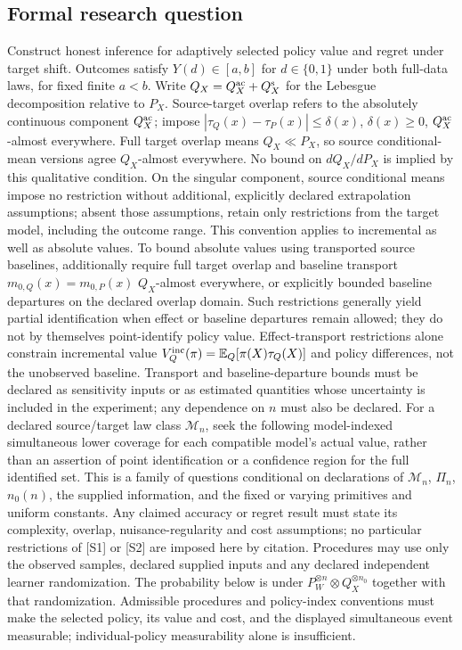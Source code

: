 \documentclass[11pt,a4paper]{article}
\begin{document}
\subsection*{Formal research question}

Construct honest inference for adaptively selected policy value and regret under target shift. Outcomes satisfy $Y(d)\in[a,b]$ for $d\in\{0,1\}$ under both full-data laws, for fixed finite $a<b$. Write $Q_X=Q_X^{\rm ac}+Q_X^{\rm s}$ for the Lebesgue decomposition relative to $P_X$. Source-target overlap refers to the absolutely continuous component $Q_X^{\rm ac}$; impose $|\tau_Q(x)-\tau_P(x)|\le\delta(x)$, $\delta(x)\ge0$, $Q_X^{\rm ac}$-almost everywhere. Full target overlap means $Q_X\ll P_X$, so source conditional-mean versions agree $Q_X$-almost everywhere. No bound on $dQ_X/dP_X$ is implied by this qualitative condition. On the singular component, source conditional means impose no restriction without additional, explicitly declared extrapolation assumptions; absent those assumptions, retain only restrictions from the target model, including the outcome range. This convention applies to incremental as well as absolute values. To bound absolute values using transported source baselines, additionally require full target overlap and baseline transport $m_{0,Q}(x)=m_{0,P}(x)$ $Q_X$-almost everywhere, or explicitly bounded baseline departures on the declared overlap domain. Such restrictions generally yield partial identification when effect or baseline departures remain allowed; they do not by themselves point-identify policy value. Effect-transport restrictions alone constrain incremental value $V_Q^{\rm inc}(\pi)=\mathbb E_Q[\pi(X)\tau_Q(X)]$ and policy differences, not the unobserved baseline. Transport and baseline-departure bounds must be declared as sensitivity inputs or as estimated quantities whose uncertainty is included in the experiment; any dependence on $n$ must also be declared. For a declared source/target law class $\mathcal M_n$, seek the following model-indexed simultaneous lower coverage for each compatible model's actual value, rather than an assertion of point identification or a confidence region for the full identified set. This is a family of questions conditional on declarations of $\mathcal M_n$, $\Pi_n$, $n_0(n)$, the supplied information, and the fixed or varying primitives and uniform constants. Any claimed accuracy or regret result must state its complexity, overlap, nuisance-regularity and cost assumptions; no particular restrictions of [S1] or [S2] are imposed here by citation. Procedures may use only the observed samples, declared supplied inputs and any declared independent learner randomization. The probability below is under $P_W^{\otimes n}\otimes Q_X^{\otimes n_0}$ together with that randomization. Admissible procedures and policy-index conventions must make the selected policy, its value and cost, and the displayed simultaneous event measurable; individual-policy measurability alone is insufficient.
\end{document}
